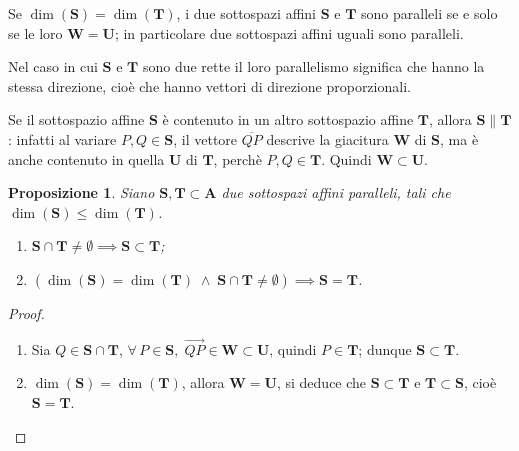 \documentclass{article}
\theoremstyle{plain}
\newtheorem{prop}[thm]{Proposizione}
\theoremstyle{definition}
\theoremstyle{remark}
\begin{document}
\vspace{10pt}

Se $\dim(\mathbf{S})=\dim(\mathbf{T})$, i due sottospazi affini $\mathbf{S}$ e $\mathbf{T}$ sono paralleli se e solo se le loro $\mathbf{W}=\mathbf{U}$; in particolare due sottospazi affini uguali sono paralleli. 

\vspace{10pt}

Nel caso in cui $\mathbf{S}$ e $\mathbf{T}$ sono due rette il loro parallelismo significa che hanno la stessa direzione, cioè che hanno vettori di direzione proporzionali.

\vspace{10pt}

Se il sottospazio affine $\mathbf{S}$ è contenuto in un altro sottospazio affine $\mathbf{T}$, allora $\mathbf{S}\parallel\mathbf{T}$: infatti al variare $P,Q\in\mathbf{S}$, il vettore $\overline{QP}$ descrive la giacitura $\mathbf{W}$ di $\mathbf{S}$, ma è anche contenuto in quella $\mathbf{U}$ di $\mathbf{T}$, perchè $P,Q\in\mathbf{T}$. Quindi $\mathbf{W}\subset\mathbf{U}$.

\vspace{10pt}

\begin{bxthm}
\begin{prop}\label{paralleli}
Siano $\mathbf{S},\mathbf{T}\subset\mathbf{A}$ due sottospazi affini paralleli, tali che $\dim(\mathbf{S})\leq\dim(\mathbf{T})$.
\begin{enumerate}
    \item $\mathbf{S}\cap\mathbf{T}\neq\emptyset\implies \mathbf{S}\subset \mathbf{T}$;
    \item $(\dim(\mathbf{S})=\dim(\mathbf{T})\;\land\;\mathbf{S}\cap\mathbf{T}\neq\emptyset)\implies \mathbf{S}=\mathbf{T}$.
\end{enumerate}
\end{prop}
\end{bxthm}
\begin{proof}\hfill
\begin{enumerate}
    \item Sia $Q\in\mathbf{S}\cap\mathbf{T}$, $\forall\,P\in\mathbf{S},\;\overrightarrow{QP}\in\mathbf{W}\subset\mathbf{U}$, quindi $P\in\mathbf{T}$; dunque $\mathbf{S}\subset\mathbf{T}$.
    \item $\dim(\mathbf{S})=\dim(\mathbf{T})$, allora $\mathbf{W}=\mathbf{U}$, si deduce che $\mathbf{S}\subset\mathbf{T}$ e $\mathbf{T}\subset\mathbf{S}$, cioè $\mathbf{S}=\mathbf{T}$.
\end{enumerate}
\end{proof}
\end{document}
